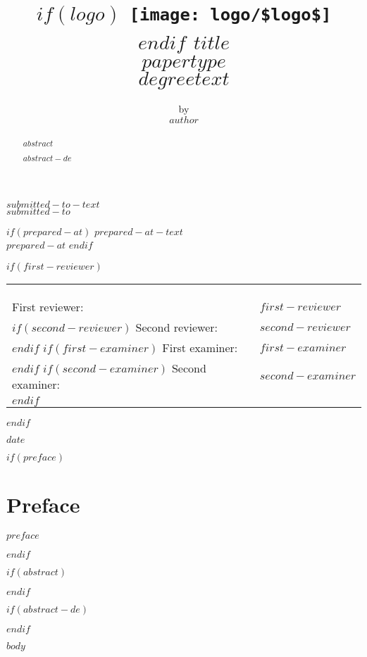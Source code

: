 \documentclass[11pt,a4paper,twoside,openright,openbib]{memoir}
\author{
  \small{by} \vspace{.5cm} 											\\
	\Large{\textbf{$author$}}}
\title{
	\textbf{\vspace{-2.5cm}
	$if(logo)$
	  \texttt{[image: logo/\$logo\$]} \\
	$endif$
	\vspace{3cm}\Huge{$title$} }\\
	\vspace{1cm}
	\Large{\textbf{$papertype$}}\\
	\vspace{0.2cm}
	\normalsize{$degreetext$}}
\date{}
\begin{document}
\frontmatter

\begin{titlingpage}
  \begin{center}
    \maketitle
    \vspace{-1cm}
    \small{$submitted-to-text$} \\
    \small{$submitted-to$}

    $if(prepared-at)$
    \vspace{0.5cm}
    \small{$prepared-at-text$} \\
    \small{$prepared-at$}
    $endif$

    $if(first-reviewer)$
    \begin{tabular}{ll}
    & \\
    & \\
    & \\
    First reviewer: & $first-reviewer$ \\
    $if(second-reviewer)$
    Second reviewer: & $second-reviewer$ \\
    $endif$
    $if(first-examiner)$
    First examiner: & $first-examiner$ \\
    $endif$
    $if(second-examiner)$
    Second examiner: & $second-examiner$ \\
    $endif$
    & \\
    \end{tabular}
    $endif$

    \vspace{\fill}
    \small{$date$}
  \end{center}
\end{titlingpage}

\setcounter{page}{1}

$if(preface)$
  \chapter*{Preface}
  $preface$
$endif$

$if(abstract)$
  \abstractintoc
  \abstractnum
  \begin{abstract}
  $abstract$
  \end{abstract}
$endif$

$if(abstract-de)$
  \cleardoublepage
  \abstractintoc
  \abstractnum
  \begin{abstract}
  $abstract-de$
  \end{abstract}
$endif$

\cleardoublepage

\tableofcontents*

\cleardoublepage

\listoffigures

\mainmatter
$body$
\end{document}

